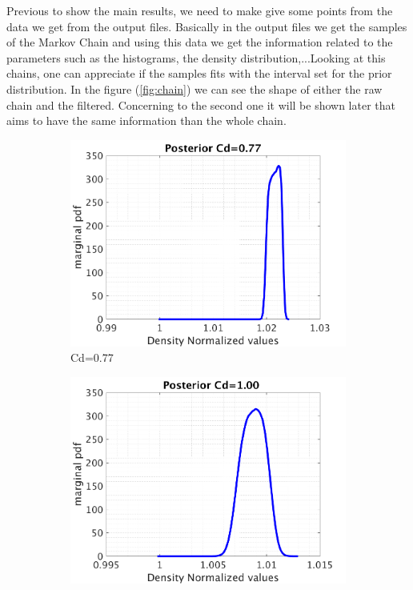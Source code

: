 \documentclass{article}
\begin{document}
Previous to show the main results, we need to make give some points from the data we get from the output files. Basically in the output files we get the samples of the Markov Chain and using this data we get the information related to the parameters such as the histograms, the density distribution,...Looking at this chains, one can appreciate if the samples fits with the interval set for the prior distribution.
In the figure (\ref{fig:chain}) we can see the shape of either the raw chain and the filtered. Concerning to the second one it  will be shown later that aims to have the same information than the whole chain.



\begin{figure}[H]
\captionsetup[subfigure]{justification=centering}
\begin{center}
  \begin{subfigure}{0.4\textwidth}
    \centering\includegraphics[width=1.1\textwidth,keepaspectratio]{images/inverse_problem/infer_radius/0_77/densityraw_PDF.png}
    \caption{\centering Cd=0.77}
  \end{subfigure}
 \begin{subfigure}{0.4\textwidth}
    \centering\includegraphics[width=1.1\textwidth,keepaspectratio]{images/inverse_problem/infer_radius/drag_01/densityraw_PDF.png}

\end{subfigure}
\end{center}
\end{figure}
\end{document}
